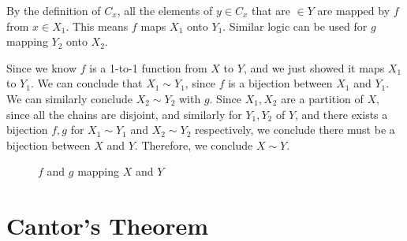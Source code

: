 {{\item By the definition of $C_x$, all the elements of $y \in C_x$ that are $\in Y$ 
are mapped by $f$ from $x \in X_1$. This means $f$ maps $X_1$ onto $Y_1$. Similar logic can 
be used for $g$ mapping $Y_2$ onto $X_2$.

Since we know $f$ is a 1-to-1 function from $X$ to $Y$, and we just showed it maps $X_1$ to $Y_1$.
We can conclude that $X_1 \sim Y_1$, since $f$ is a bijection between $X_1$ and $Y_1$.
We can similarly conclude $X_2 \sim Y_2$ with $g$.
Since $X_1, X_2$ are a partition of $X$, since all the chains are disjoint, and similarly for $Y_1, Y_2$ of $Y$, and there exists a bijection 
$f, g$ for $X_1 \sim Y_1$ and $X_2 \sim Y_2$ respectively, we conclude there must be a bijection between $X$ and $Y$.
Therefore, we conclude $X \sim Y$.

\begin{figure}[H]
	\centering
	\def\ellipseX{1}
	\def\ellipseY{2}
	\caption{$f$ and $g$ mapping $X$ and $Y$}
	\label{fig:problem_1_4_13_bijection}
\end{figure}
}
}

\section{Cantor's Theorem}
\setcounter{exercise}{1}




